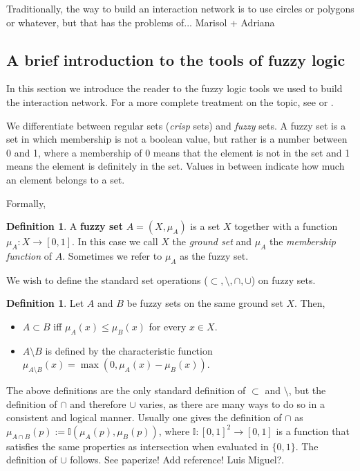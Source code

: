 \documentclass[12pt]{article}
\numberwithin{equation}{section} %
\numberwithin{figure}{section} %
\def\II{{\mathbb{I}}}
\theoremstyle{definition}
\newtheorem{definition}[theorem]{Definition}
\def\tcr#1{\textcolor{MyRed}{#1}}
\begin{document}
Traditionally, the way to build an interaction network is to use circles or polygons or whatever, but that has the problems of... \tcr{Marisol + Adriana}

\subsection{A brief introduction to the tools of fuzzy logic}
In this section we introduce the reader to the fuzzy logic tools we used to build the interaction network. For a more complete treatment on the topic, see \cite{FuzzyLogicSuperBook} or \cite{FuzzyLogicSuperBook2}. 

We differentiate between regular sets (\emph{crisp} sets)  and \emph{fuzzy} sets. A fuzzy set is a set in which membership is not a boolean value, but rather is a number between 0 and 1, where a membership of 0 means that the element is not in the set and 1 means the element is definitely in the set. Values in between indicate how much an element belongs to a set.

Formally,
\begin{definition}
	A \textbf{fuzzy set} $A=(X,\mu_A)$ is a set $X$ together with a function $\mu_A:X \to [0,1]$. In this case we call $X$ the \emph{ground set} and $\mu_A$ the \emph{membership function} of $A$. Sometimes we refer to $\mu_A$ as the fuzzy set.
\end{definition}

We wish to define the standard set operations ($\subset,\setminus,\cap,\cup$) on fuzzy sets. 

\begin{definition}
	Let $A$ and $B$ be fuzzy sets on the same ground set $X$. Then,
	\begin{itemize}
		\item $A \subset B$ iff $\mu_A(x) \leq \mu_B(x)$ for every $x\in X$.
		\item $A\setminus B$ is defined by the characteristic function $\mu_{A\setminus B}(x) = \max(0,\mu_A(x)-\mu_B(x))$.
	\end{itemize}
\end{definition}

The above definitions are the only standard definition of $\subset$ and $\setminus$, but the definition of $\cap$ and therefore $\cup$ varies, as there are many ways to do so in a consistent and logical manner. Usually one gives the definition of $\cap$ as $\mu_{A\cap B}(p) := \II(\mu_A(p),\mu_B(p))$, where  $\II : [0,1]^2 \to [0,1]$ is a function that satisfies the same properties as intersection when evaluated in $\{0,1\}$. The definition of $\cup$ follows. See \cite{some reference} \tcr{paperize! Add reference! Luis Miguel?}. 
\end{document}
